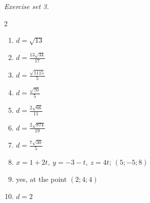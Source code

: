 \par\noindent\emph{Exercise set 3.}\nopagebreak
\begin{multicols}{2}\raggedright
\begin{enumerate}[label=\arabic*., leftmargin=*, itemsep=1pt]
\item $d=\sqrt{13}$
\item $d=\frac{13 \sqrt{34}}{17}$
\item $d=\frac{\sqrt{1115}}{5}$
\item $d=\frac{\sqrt{70}}{5}$
\item $d=\frac{2 \sqrt{66}}{11}$
\item $d=\frac{2 \sqrt{874}}{19}$
\item $d=\frac{7 \sqrt{30}}{5}$
\item $x=1+2t,\ y=-3-t,\ z=4t$; $(5;-5;8)$
\item yes, at the point $(2;4;4)$
\item $d=2$
\end{enumerate}
\end{multicols}
